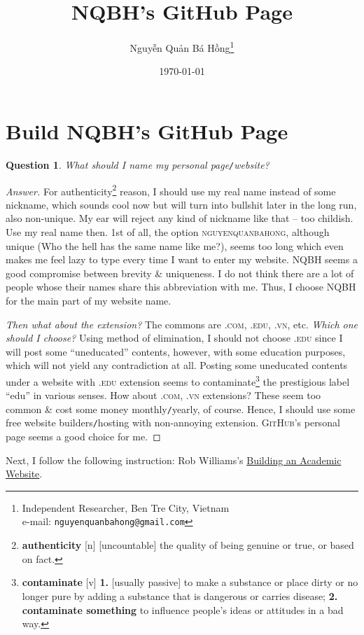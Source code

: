 \documentclass{article}
\title{NQBH's GitHub Page}
\author{\selectlanguage{vietnamese} Nguyễn Quản Bá Hồng\footnote{Independent Researcher, Ben Tre City, Vietnam\\e-mail: \texttt{nguyenquanbahong@gmail.com}}}
\date{\today}
\numberwithin{equation}{section}
\newtheorem{question}{Question}[section]
\begin{document}
\maketitle
{}
\begin{abstract}
	
\end{abstract}

\tableofcontents
{}


\section{Build NQBH's GitHub Page}

\begin{question}
	What should I name my personal page\emph{\texttt{/}}website?
\end{question}

\begin{proof}[Answer]
	For authenticity\footnote{\textbf{authenticity} [n] [uncountable] the quality of being genuine or true, or based on fact.} reason, I should use my real name instead of some nickname, which sounds cool now but will turn into bullshit later in the long run, also non-unique. My ear will reject any kind of nickname like that -- too childish. Use my real name then. 1st of all, the option \textsc{nguyenquanbahong}, although unique (Who the hell has the same name like me?), seems too long which even makes me feel lazy to type every time I want to enter my website. \textsc{NQBH} seems a good compromise between brevity \& uniqueness. I do not think there are a lot of people whose their names share this abbreviation with me. Thus, I choose NQBH for the main part of my website name.
	
	\textit{Then what about the extension?} The commons are \textsc{.com, .edu, .vn}, etc. \textit{Which one should I choose?} Using method of elimination, I should not choose \textsc{.edu} since I will post some ``uneducated'' contents, however, with some education purposes, which will not yield any contradiction at all. Posting some uneducated contents under a website with \textsc{.edu} extension seems to contaminate\footnote{\textbf{contaminate} [v] \textbf{1.} [usually passive] to make a substance or place dirty or no longer pure by adding a substance that is dangerous or carries disease; \textbf{2.} \textbf{contaminate something} to influence people's ideas or attitudes in a bad way.} the prestigious label ``edu'' in various senses. How about \textsc{.com, .vn} extensions? These seem too common \& cost some money monthly\texttt{/}yearly, of course. Hence, I should use some free website builders\texttt{/}hosting with non-annoying extension. \textsc{GitHub}'s personal page seems a good choice for me.
\end{proof}
Next, I follow the following instruction: Rob Williams's \href{https://jayrobwilliams.com/posts/2020/06/academic-website/}{Building an Academic Website}.
\end{document}
